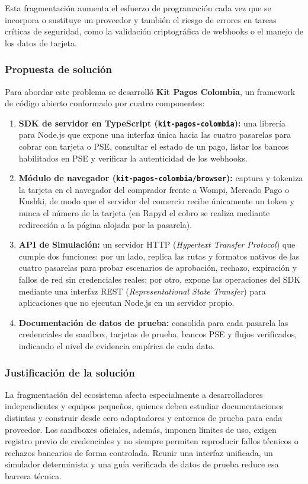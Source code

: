 Esta fragmentación aumenta el esfuerzo de programación cada vez que se incorpora o sustituye un proveedor y también el riesgo de errores en tareas críticas de seguridad, como la validación criptográfica de webhooks o el manejo de los datos de tarjeta.

\subsubsection{Propuesta de solución}
Para abordar este problema se desarrolló \textbf{Kit Pagos Colombia}, un framework de código abierto conformado por cuatro componentes:

\begin{enumerate}
    \item \textbf{SDK de servidor en TypeScript (\texttt{kit-pagos-colombia}):} una librería para Node.js que expone una interfaz única hacia las cuatro pasarelas para cobrar con tarjeta o PSE, consultar el estado de un pago, listar los bancos habilitados en PSE y verificar la autenticidad de los webhooks.
    \item \textbf{Módulo de navegador (\texttt{kit-pagos-colombia/browser}):} captura y tokeniza la tarjeta en el navegador del comprador frente a Wompi, Mercado Pago o Kushki, de modo que el servidor del comercio recibe únicamente un token y nunca el número de la tarjeta (en Rapyd el cobro se realiza mediante redirección a la página alojada por la pasarela).
    \item \textbf{API de Simulación:} un servidor HTTP (\textit{Hypertext Transfer Protocol}) que cumple dos funciones: por un lado, replica las rutas y formatos nativos de las cuatro pasarelas para probar escenarios de aprobación, rechazo, expiración y fallos de red sin credenciales reales; por otro, expone las operaciones del SDK mediante una interfaz REST (\textit{Representational State Transfer}) para aplicaciones que no ejecutan Node.js en un servidor propio.
    \item \textbf{Documentación de datos de prueba:} consolida para cada pasarela las credenciales de sandbox, tarjetas de prueba, bancos PSE y flujos verificados, indicando el nivel de evidencia empírica de cada dato.
\end{enumerate}

\subsubsection{Justificación de la solución}
La fragmentación del ecosistema afecta especialmente a desarrolladores independientes y equipos pequeños, quienes deben estudiar documentaciones distintas y construir desde cero adaptadores y entornos de prueba para cada proveedor. Los sandboxes oficiales, además, imponen límites de uso, exigen registro previo de credenciales y no siempre permiten reproducir fallos técnicos o rechazos bancarios de forma controlada. Reunir una interfaz unificada, un simulador determinista y una guía verificada de datos de prueba reduce esa barrera técnica.

